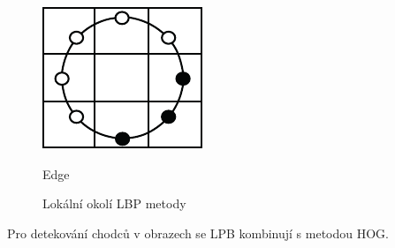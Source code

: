 \begin{figure}[H]
\begin{minipage}[b]{.17\textwidth}
  \includegraphics[width=.9\linewidth]{figures/lbp_edge}
  \caption*{Edge}
\end{minipage}
\caption{Lokální okolí LBP metody}
\label{fig:lbpvzory}
\end{figure}

Pro detekování chodců v obrazech se LPB kombinují s metodou HOG. \cite{hoglpb}